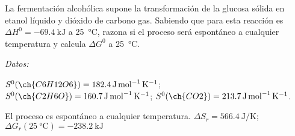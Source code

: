 \documentclass[10pt,a5paper,twoside]{article}
\newenvironment{gexdatos}{
      \vspace{4pt}
      \noindent\small\textit{Datos:}
    }{\vspace{5pt}}
\begin{document}
  \begin{exercise}[
    tags    = {termodinámica, entalpía, entalpia de reacción, calor},
    topics  = {química, termoquímica, termodinámica},
    source  = {FQ 1B ANA 2016, p167, e34},
  ]
  La fermentación alcohólica supone la transformación de la glucosa sólida en etanol líquido y dióxido de carbono gas. Sabiendo que para esta reacción es \( \Delta H^0 = \SI{-69.4}{\kilo\joule} \) a \SI{25}{\celsius}, razona si el proceso será espontáneo a
  cualquier temperatura y calcula \( \Delta G^0 \) a \SI{25}{\celsius}.

  \begin{gexdatos}
    \( S^0 (\ch{C6H12O6}) = \SI{182.4}{\joule\per\mole\per\kelvin} \);
    \( S^0 (\ch{C2H6O}) = \SI{160.7}{\joule\per\mole\per\kelvin} \);
    \( S^0 (\ch{CO2}) = \SI{213.7}{\joule\per\mole\per\kelvin} \).
  \end{gexdatos}

\end{exercise}

\begin{solution}
  El proceso es espontáneo a cualquier temperatura. \( \Delta S_r = \SI{566.4}{\joule\per\kelvin} \); \( \Delta G_r (\SI{25}{\celsius}) = \SI{-238.2}{\kilo\joule} \)
\end{solution}
\end{document}
